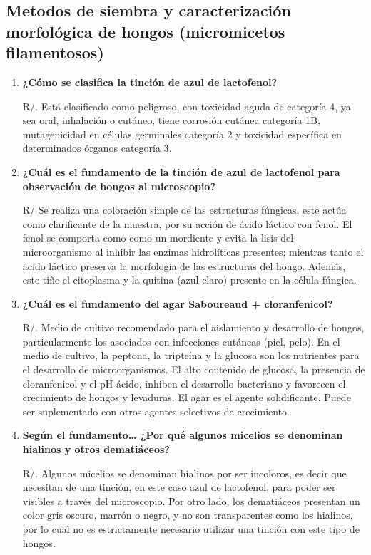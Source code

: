 \documentclass[journal,transmag]{IEEEtran}
\begin{document}
\subsection{\textbf{Metodos de siembra y caracterización morfológica de hongos (micromicetos filamentosos) }}
	
	\begin{enumerate}
	\item \textbf{¿Cómo se clasifica la tinción de azul de lactofenol?}
	
	R/. Está clasificado como peligroso, con toxicidad aguda de categoría 4, ya sea oral, inhalación o cutáneo, tiene corrosión cutánea categoría 1B, mutagenicidad en células germinales categoría 2 y toxicidad específica en determinados órganos categoría 3.
	

	\item \textbf{¿Cuál es el fundamento de la tinción de azul de lactofenol para observación de hongos al microscopio?}
	
	R/ Se realiza una coloración simple de las estructuras fúngicas, este actúa como clarificante de la muestra, por su acción de ácido láctico con fenol. El fenol se comporta como como un mordiente y evita la lisis del microorganismo al inhibir las enzimas hidrolíticas presentes; mientras tanto el ácido láctico preserva la morfología de las estructuras del hongo. Además, este tiñe el citoplasma y la quitina (azul claro) presente en la célula fúngica.

	
	\item \textbf{¿Cuál es el fundamento del agar Saboureaud + cloranfenicol?}
	
	R/. Medio de cultivo recomendado para el aislamiento y desarrollo de hongos, particularmente los asociados con infecciones cutáneas (piel, pelo). En el medio de cultivo, la peptona, la tripteína y la glucosa son los nutrientes para el desarrollo de microorganismos. El alto contenido de glucosa, la presencia de cloranfenicol y el pH ácido, inhiben el desarrollo bacteriano y favorecen el crecimiento de hongos y levaduras. El agar es el agente solidificante. Puede ser suplementado con otros agentes selectivos de crecimiento.

	
	
	\item \textbf{Según el fundamento… ¿Por qué algunos micelios se denominan hialinos y otros dematiáceos?}
	
	R/. Algunos micelios se denominan hialinos por ser incoloros, es decir que necesitan de una tinción, en este caso azul de lactofenol, para poder ser visibles a través del microscopio. Por otro lado, los dematiáceos presentan un color gris oscuro, marrón o negro, y no son transparentes como los hialinos, por lo cual no es estrictamente necesario utilizar una tinción con este tipo de hongos. 
	

\end{enumerate}
\end{document}
